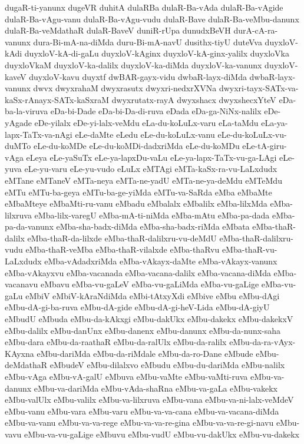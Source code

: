 {dugaR-ti-yanunx
dugeVR
duhitA
dulaRBa
dulaR-Ba-vAda
dulaR-Ba-vAgide
dulaR-Ba-vAgu-vanu
dulaR-Ba-vAgu-vudu
dulaR-Bave
dulaR-Ba-veMbu-danunx
dulaR-Ba-veMdathaR
dulaR-BaveV
duniR-rUpa
dunudxBeVH
durA-cA-ra-vanunx
dura-Bi-mA-na-diMda
duru-Bi-mA-navU
dusithx-tiyU
duteVva
duyxloV-kAdi
duyxloV-kA-di-gaLu
duyxloV-kAginx
duyxloV-kA-ginx-yalilx
duyxloVka
duyxloVkaM
duyxloV-ka-dalilx
duyxloV-ka-diMda
duyxloV-ka-vanunx
duyxloV-kaveV
duyxloV-kavu
duyxtf
dwBAR-gayx-vidu
dwbaR-layx-diMda
dwbaR-layx-vanunx
dwvx
dwyxrahaM
dwyxrasutx
dwyxri-nedxrXVNa
dwyxri-tayx-SATx-va-kaSx-rAnayx-SATx-kaSxraM
dwyxrutatx-rayA
dwyxshacx
dwyxshecxYteV
eDa-ba-la-viruva
eDa-bi-Dade
eDa-bi-Da-di-ruva
eDada
eDa-ga-NiNx-nalilx
eDe-yAgade
eDe-yilalx
eDe-yi-lalx-veMdu
eLa-du-koLuLx-varu
eLa-taMdu
eLa-ya-lapx-TaTx-va-nAgi
eLe-daMte
eLedu
eLe-du-koLuLx-vanu
eLe-du-koLuLx-vu-duMTo
eLe-du-koMDe
eLe-du-koMDi-dadxriMda
eLe-du-koMDu
eLe-tA-giru-vAga
eLeya
eLe-yaSuTx
eLe-ya-lapxDu-vaLu
eLe-ya-lapx-TaTx-vu-ga-LAgi
eLe-yuva
eLe-yu-varu
eLe-yu-vudo
eLuLx
eMTAgi
eMTa-kaSx-ra-vu-LaLxdudx
eMTane
eMTaneV
eMTa-neya
eMTa-ne-yadU
eMTa-ne-ya-deMdu
eMTeMdu
eMTu
eMTu-ba-geya
eMTu-ba-ge-yiMda
eMTu-va-SaRda
eMba
eMbaMte
eMbaMteye
eMbaMti-ru-vanu
eMbadu
eMbalalx
eMbalilx
eMba-lilxMda
eMba-lilxruva
eMba-lilx-varegU
eMba-mA-ti-niMda
eMba-mAtu
eMba-pa-dada
eMba-pa-da-vanunx
eMba-sha-badx-diMda
eMba-sha-badx-riMda
eMbata
eMba-thaR-dalilx
eMba-thaR-da-lilxde
eMba-thaR-dalilxru-vu-deMdU
eMba-thaR-dalilxru-vudu
eMba-thaR-veMba
eMba-thaR-vilalxde
eMba-thaRvu
eMba-thaR-vu-LaLxdudx
eMba-vAdadxriMda
eMba-vAkayx-daMte
eMba-vAkayx-vanunx
eMba-vAkayxvu
eMba-vacanada
eMba-vacana-dalilx
eMba-vacana-diMda
eMba-vacanavu
eMbavu
eMba-vu-gaLeV
eMba-vu-gaLiMda
eMba-vu-gaLige
eMba-vu-gaLu
eMbiV
eMbiV-kAraNdiMda
eMbi-tAtxyXdi
eMbive
eMbu
eMbu-dAgi
eMbu-dA-gi-ba-ruva
eMbu-dA-gide
eMbu-dA-gi-heV-Lida
eMbu-dA-giyU
eMbudU
eMbuda
eMbu-da-kAkxgi
eMbu-dakUkx
eMbu-dakekx
eMbu-dakekxV
eMbu-dalilx
eMbu-danUnx
eMbu-danenx
eMbu-danunx
eMbu-da-nunx-saha
eMbu-dara
eMbu-da-raathaR
eMbu-da-ralUlx
eMbu-da-ralilx
eMbu-da-ra-vAyx-KAyxna
eMbu-dariMda
eMbu-da-riMdale
eMbu-da-ro-Dane
eMbude
eMbu-deMdathaR
eMbudeV
eMbu-dilalxvo
eMbudu
eMbu-du-dariMda
eMbu-nalilx
eMbu-vAga
eMbu-vA-galU
eMbuva
eMbu-vaMte
eMbu-vaMti-ruva
eMbu-va-danunx
eMbu-va-dariMda
eMbu-vAda-shaRna
eMbu-va-gaLa
eMbu-vakekx
eMbu-valUlx
eMbu-valilx
eMbu-va-lilxruva
eMbu-vana
eMbu-va-ni-lalx-veMdeV
eMbu-vanu
eMbu-vara
eMbu-varu
eMbu-va-va-cana
eMbu-va-vacana-diMda
eMbu-va-vanu
eMbu-va-va-rege
eMbu-va-va-re-gina
eMbu-va-va-re-gi-navu
eMbu-vavu
eMbu-va-vu-gaLige
eMbuvu
eMbu-vudU
eMbu-vu-dakUkx
eMbu-vu-dakekx
}
